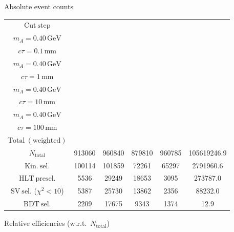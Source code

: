 \documentclass[10pt,a4paper]{article}
\renewcommand{\arraystretch}{1.4}
\begin{document}
{\footnotesize\setlength{\tabcolsep}{4pt}\renewcommand{\arraystretch}{1.05}%
\vspace{12pt}

Absolute event counts

\begin{tabular}{cccccc}
\toprule
$\mathrm{Cut\ step}$ & \shortstack{$m_{\pi}=4\,\mathrm{GeV}$\\$m_{A}=0.40\,\mathrm{GeV}$\\$c\tau=0.1\,\mathrm{mm}$} & \shortstack{$m_{\pi}=4\,\mathrm{GeV}$\\$m_{A}=0.40\,\mathrm{GeV}$\\$c\tau=1\,\mathrm{mm}$} & \shortstack{$m_{\pi}=4\,\mathrm{GeV}$\\$m_{A}=0.40\,\mathrm{GeV}$\\$c\tau=10\,\mathrm{mm}$} & \shortstack{$m_{\pi}=4\,\mathrm{GeV}$\\$m_{A}=0.40\,\mathrm{GeV}$\\$c\tau=100\,\mathrm{mm}$} & \shortstack{$\mathrm{QCD}$\\$\mathrm{Total\ (weighted)}$} \\
\midrule
$N_{\mathrm{total}}$ & 913060 & 960840 & 879810 & 960785 & 105619246.9\\
$\mathrm{Kin.\ sel.}$ & 100114 & 101859 & 72261 & 65297 & 2791960.6\\
$\mathrm{HLT\ presel.}$ & 5536 & 29249 & 18653 & 3095 & 273787.0\\
$\mathrm{SV\ sel.}$ ($\chi^2{<}10$) & 5387 & 25730 & 13862 & 2356 & 88232.0\\
$\mathrm{BDT\ sel.}$ & 2209 & 17675 & 9343 & 1374 & 12.9\\
\bottomrule
\end{tabular}

\vspace{18pt}

Relative efficiencies (w.r.t.\ $N_{\mathrm{total}}$)

}
\end{document}
